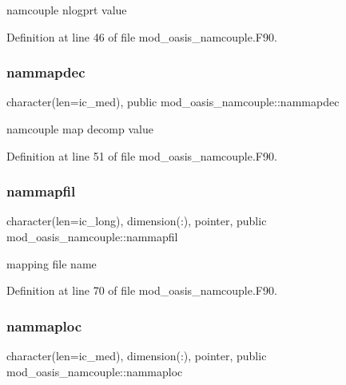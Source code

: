 namcouple nlogprt value 



Definition at line 46 of file mod\+\_\+oasis\+\_\+namcouple.\+F90.

\mbox{\label{namespacemod__oasis__namcouple_a484aaf8a6d7eaa0675a8249fa94509cf}} 
\subsubsection{\texorpdfstring{nammapdec}{nammapdec}}
{\footnotesize\ttfamily character(len=ic\+\_\+med), public mod\+\_\+oasis\+\_\+namcouple\+::nammapdec}



namcouple map decomp value 



Definition at line 51 of file mod\+\_\+oasis\+\_\+namcouple.\+F90.

\mbox{\label{namespacemod__oasis__namcouple_a9fc6ac674a8cfa68d9d15ad13213e21d}} 
\subsubsection{\texorpdfstring{nammapfil}{nammapfil}}
{\footnotesize\ttfamily character(len=ic\+\_\+long), dimension(\+:), pointer, public mod\+\_\+oasis\+\_\+namcouple\+::nammapfil}



mapping file name 



Definition at line 70 of file mod\+\_\+oasis\+\_\+namcouple.\+F90.

\mbox{\label{namespacemod__oasis__namcouple_a7316d7d322da7cf10f315e38c145ebbb}} 
\subsubsection{\texorpdfstring{nammaploc}{nammaploc}}
{\footnotesize\ttfamily character(len=ic\+\_\+med), dimension(\+:), pointer, public mod\+\_\+oasis\+\_\+namcouple\+::nammaploc}



